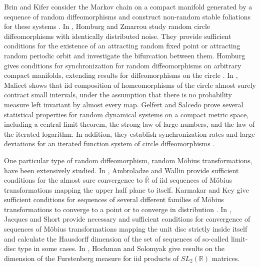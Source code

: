 \documentclass[12pt,reqno]{amsart}
\numberwithin{theorem}{section}
\begin{document}
Brin and Kifer consider the Markov chain on a compact manifold generated by a sequence of random diffeomorphisms and construct non-random stable foliations for these systems \cite{kifer_random_diffeo}. In \cite{homburg_random_diffeo}, Homburg and Zmarrou study random circle diffeomorphisms with identically distributed noise. They provide sufficient conditions for the existence of an attracting random fixed point or attracting random periodic orbit and investigate the bifurcation between them. Homburg gives conditions for synchronization for random diffeomorphisms on arbitrary compact manifolds, extending results for diffeomorphisms on the circle \cite{homburg_synchronization}. In \cite{malicet}, Malicet shows that iid composition of homeomorphisms of the circle almost surely contract small intervals, under the assumption that there is no probability measure left invariant by almost every map. Gelfert and Salcedo prove several statistical properties for random dynamical systems on a compact metric space, including a central limit theorem, the strong law of large numbers,
and the law of the iterated logarithm. In addition, they establish synchronization rates and large deviations for an iterated function system of circle diffeomorphisms \cite{gelfert_synchronization}. 

One particular type of random diffeomorphism, random Möbius transformations, have been extensively studied. In \cite{Mobius_plane}, Ambroladze and Wallin provide sufficient conditions for the almost sure convergence to $\overline{\mathbb{R}}$ of iid sequences of Möbius transformations mapping the upper half plane to itself. Karmakar and Key give sufficient conditions for sequences of several different families of Möbius transformations to converge to a point or to converge in distribution \cite{iid_Mobius}. In \cite{Mobius_composition}, Jacques and Short provide necessary and sufficient conditions for convergence of sequences of Möbius transformations mapping the unit disc strictly inside itself and calculate the Hausdorﬀ dimension of the set of sequences of so-called
limit-disc type in some cases. In \cite{hochman_furstenberg}, Hochman and Solomyak give results on the dimension
of the Furstenberg measure for iid products of $SL_{2}(\mathbb{R})$ matrices.
\end{document}
